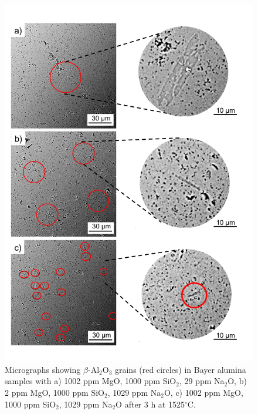 \newpage
\begin{figure}[H]
	\centering
	\includegraphics[scale=0.7]{Chapter-5/Figures/Figure10.png}
	\caption{Micrographs showing $\beta$-Al$_{2}$O$_{3}$ grains (red circles) in Bayer alumina samples with a) 1002 ppm MgO, 1000 ppm SiO$_{2}$, 29 ppm Na$_{2}$O, b) 2 ppm MgO, 1000 ppm SiO$_{2}$, 1029 ppm Na$_{2}$O, c) 1002 ppm MgO, 1000 ppm SiO$_{2}$, 1029 ppm Na$_{2}$O after 3 h at 1525$^{\circ}$C.}
	\label{Ch5-figure:Figure10}
\end{figure}

